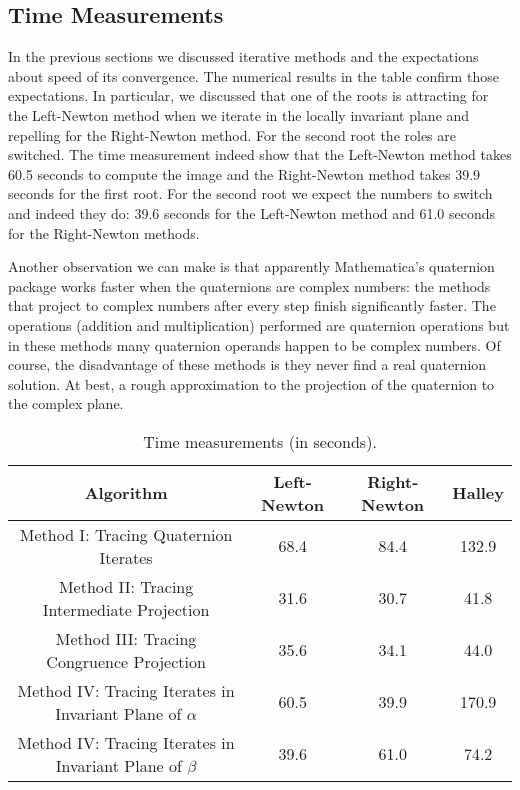 \documentclass{article}
\theoremstyle{definition}
\begin{document}
\subsection{Time Measurements}

In the previous sections we discussed iterative methods and the expectations about speed of its convergence. The numerical results in the table confirm those expectations. In particular, we discussed that one of the roots is attracting for the Left-Newton method when we iterate in the locally invariant plane and repelling for the Right-Newton method. For the second root the roles are switched. The time measurement indeed show  that the Left-Newton method takes 60.5 seconds to compute the image and the Right-Newton method takes 39.9 seconds for the first root.
 For the second root we expect the numbers to switch and indeed they do: 39.6 seconds for the Left-Newton method and 61.0 seconds for the Right-Newton methods.

Another observation we can make is that apparently Mathematica's quaternion package works faster when the quaternions are complex numbers: the methods that project to complex numbers after every step finish significantly faster.  The operations (addition and multiplication) performed are quaternion operations but in these methods many quaternion operands happen to be complex numbers. Of course, the disadvantage of these methods is they never find a real quaternion solution. At best, a rough approximation to the projection of the quaternion to the complex plane.

\begin{table}
\begin{center}
\begin{tabular}{|c|c|c|c|}
\hline
{} Algorithm &Left-Newton & Right-Newton & Halley\\
\hline
 Method I: Tracing Quaternion Iterates & 68.4 & 84.4 & 132.9\\
Method II: Tracing Intermediate Projection & 31.6 & 30.7 & 41.8\\
Method III: Tracing Congruence Projection & 35.6 & 34.1 & 44.0\\
Method IV: Tracing Iterates in Invariant Plane  of $\alpha$ & 60.5 & 39.9 & 170.9\\
Method IV: Tracing Iterates in Invariant Plane  of $\beta$ & 39.6 & 61.0 & 74.2 \\
\hline
\end{tabular}
\caption{Time measurements (in seconds).}
\label{TimeMeasurement}
\end{center}
\end{table}
\end{document}
